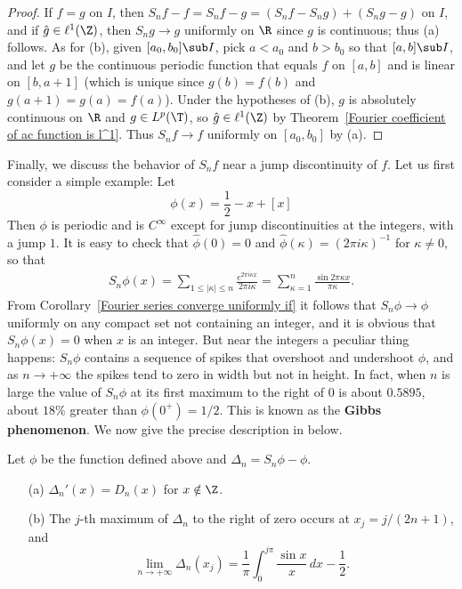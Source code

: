 \begin{proof}
If $f=g$ on $I$, then $S_nf-f=S_nf-g=(S_nf-S_ng)+(S_ng-g)$ on $I$, and if $\hat{g}\in\ell^1(\Z)$, then $S_ng\to g$ uniformly on $\R$ since $g$ is continuous; thus (a) follows. As for (b), given $[a_0,b_0]\sub I$, pick $a<a_0$ and $b>b_0$ so that $[a,b]\sub I$, and let $g$ be the continuous periodic function that equals $f$ on $[a,b]$ and is linear on $[b,a+1]$ (which is unique since $g(b)=f(b)$ and $g(a+1)=g(a)=f(a)$). Under the hypotheses of (b), $g$ is absolutely continuous on $\R$ and $g\in L^p(\T)$, so $\hat{g}\in\ell^1(\Z)$ by Theorem~\ref{Fourier coefficient of ac function is l^1}. Thus $S_nf\to f$ uniformly on $[a_0,b_0]$ by (a).
\end{proof}
Finally, we discuss the behavior of $S_nf$ near a jump discontinuity of $f$. Let us first consider a simple example: Let
\[\phi(x)=\frac{1}{2}-x+[x]\]
Then $\phi$ is periodic and is $C^\infty$ except for jump discontinuities at the integers, with a jump $1$. It is easy to check that $\hat{\phi}(0)=0$ and $\hat{\phi}(\kappa)=(2\pi i\kappa)^{-1}$ for $\kappa\neq 0$, so that
\begin{align}\label{Gibbs phenomenon-1}
S_n\phi(x)=\sum_{1\leq|\kappa|\leq n}\frac{e^{2\pi i\kappa x}}{2\pi i\kappa}=\sum_{\kappa=1}^{n}\frac{\sin 2\pi\kappa x}{\pi\kappa}.
\end{align}
From Corollary~\ref{Fourier series converge uniformly if} it follows that $S_n\phi\to\phi$ uniformly on any compact set not containing an integer, and it is obvious that $S_n\phi(x)=0$ when $x$ is an integer. But near the integers a peculiar thing happens: $S_n\phi$ contains a sequence of spikes that overshoot and undershoot $\phi$, and as $n\to+\infty$ the spikes tend to zero in width but not in height. In fact, when $n$ is large the value of $S_n\phi$ at its first maximum to the right of $0$ is about $0.5895$, about $18\%$ greater than $\phi(0^+)=1/2$. This is known as the \textbf{Gibbs phenomenon}. We now give the precise description in below.
\begin{theorem}
Let $\phi$ be the function defined above and $\Delta_n=S_n\phi-\phi$.
\begin{itemize}
\item[(a)] $\Delta_n'(x)=D_n(x)$ for $x\notin\Z$.
\item[(b)] The $j$-th maximum of $\Delta_n$ to the right of zero occurs at $x_j=j/(2n+1)$, and
\[\lim_{n\to+\infty}\Delta_n(x_j)=\frac{1}{\pi}\int_{0}^{j\pi}\frac{\sin x}{x}\,dx-\frac{1}{2}.\] 
\end{itemize}
\end{theorem}
